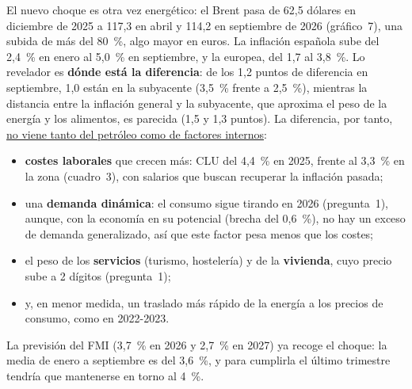 \begin{examen}
El nuevo choque es otra vez energético: el Brent pasa de 62,5 dólares en diciembre de 2025 a 117,3 en abril y 114,2 en septiembre de 2026 (gráfico~7), una subida de más del 80~\%, algo mayor en euros. La inflación española sube del 2,4~\% en enero al 5,0~\% en septiembre, y la europea, del 1,7 al 3,8~\%. Lo revelador es \textbf{dónde está la diferencia}: de los 1,2 puntos de diferencia en septiembre, 1,0 están en la subyacente (3,5~\% frente a 2,5~\%), mientras la distancia entre la inflación general y la subyacente, que aproxima el peso de la energía y los alimentos, es parecida (1,5 y 1,3 puntos). La diferencia, por tanto, \uline{no viene tanto del petróleo como de factores internos}:
\begin{itemize}
\item \textbf{costes laborales} que crecen más: CLU del 4,4~\% en 2025, frente al 3,3~\% en la zona (cuadro~3), con salarios que buscan recuperar la inflación pasada;
\item una \textbf{demanda dinámica}: el consumo sigue tirando en 2026 (pregunta~1), aunque, con la economía en su potencial (brecha del 0,6~\%), no hay un exceso de demanda generalizado, así que este factor pesa menos que los costes;
\item el peso de los \textbf{servicios} (turismo, hostelería) y de la \textbf{vivienda}, cuyo precio sube a 2 dígitos (pregunta~1);
\item y, en menor medida, un traslado más rápido de la energía a los precios de consumo, como en 2022-2023.
\end{itemize}
La previsión del FMI (3,7~\% en 2026 y 2,7~\% en 2027) ya recoge el choque: la media de enero a septiembre es del 3,6~\%, y para cumplirla el último trimestre tendría que mantenerse en torno al 4~\%.


\end{examen}
